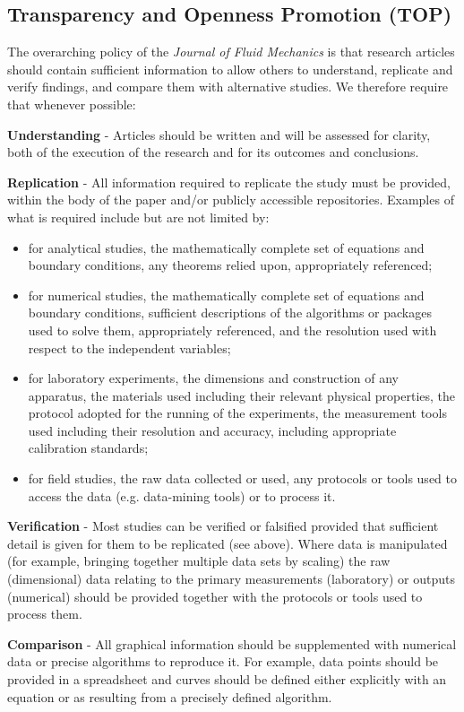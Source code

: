 \documentclass[lineno]{jfm}
\begin{document}
\subsection {Transparency and Openness Promotion (TOP)}
 The overarching policy of the {\it Journal of Fluid Mechanics} is that research articles should contain sufficient information to allow others to understand, replicate and verify findings, and compare them with alternative studies. We therefore require that whenever possible:

 {\bf Understanding} - Articles should be written and will be assessed for clarity, both of the execution of the research and for its outcomes and conclusions.

 {\bf Replication} - All information required to replicate the study must be provided, within the body of the paper and/or publicly accessible repositories.  Examples of what is required include but are not limited by:
\begin{itemize}
\item for analytical studies, the mathematically complete set of equations and boundary conditions, any theorems relied upon, appropriately referenced;
\item for numerical studies, the mathematically complete set of equations and boundary conditions, sufficient descriptions of the algorithms or packages used to solve them, appropriately referenced, and the resolution used with respect to the independent variables;
\item for laboratory experiments, the dimensions and construction of any apparatus, the materials used including their relevant physical properties, the protocol adopted for the running of the experiments, the measurement tools used including their resolution and accuracy, including appropriate calibration standards;
\item for field studies, the raw data collected or used, any protocols or tools used to access the data (e.g. data-mining tools) or to process it.
\end{itemize}
{\bf Verification} -  Most studies can be verified or falsified provided that sufficient detail is given for them to be replicated (see above).  Where data is manipulated (for example, bringing together multiple data sets by scaling) the raw (dimensional) data relating to the primary measurements (laboratory) or outputs (numerical) should be provided together with the protocols or tools used to process them.

{\bf Comparison} - All graphical information should be supplemented with numerical data or precise algorithms to reproduce it.  For example, data points should be provided in a spreadsheet and curves should be defined either explicitly with an equation or as resulting from a precisely defined algorithm.
\end{document}
